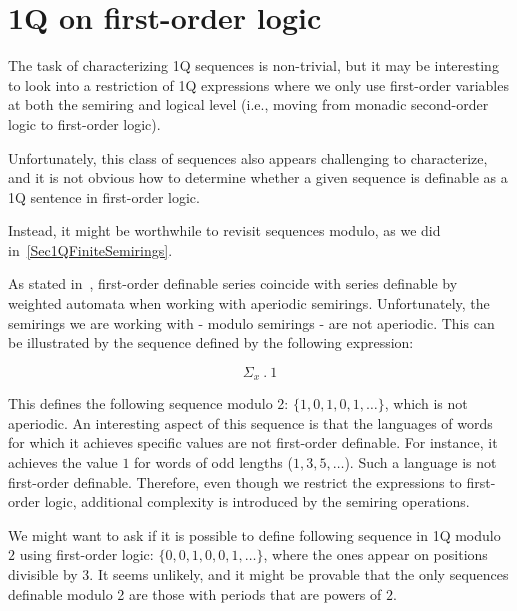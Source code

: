 \documentclass[en]{pracamgr}
\theoremstyle{definition}
\begin{document}
\section{1Q on first-order logic}
The task of characterizing 1Q sequences is non-trivial, but it may be interesting to look into a restriction of 1Q expressions where we only use first-order variables at both the semiring and logical level (i.e., moving from monadic second-order logic to first-order logic).

Unfortunately, this class of sequences also appears challenging to characterize, and it is not obvious how to determine whether a given sequence is definable as a 1Q sentence in first-order logic.

Instead, it might be worthwhile to revisit sequences modulo, as we did in~\cref{Sec1QFiniteSemirings}.

As stated in~\cite{DrosteG07}, first-order definable series coincide with series definable by weighted automata when working with aperiodic semirings. Unfortunately, the semirings we are working with - modulo semirings - are not aperiodic. This can be illustrated by the sequence defined by the following expression:

$$ \Sigma_x \ . \ 1 $$

This defines the following sequence modulo 2: $\{1, 0, 1, 0, 1, \ldots\}$, which is not aperiodic. An interesting aspect of this sequence is that the languages of words for which it achieves specific values are not first-order definable. For instance, it achieves the value $1$ for words of odd lengths ($1, 3, 5, \ldots$). Such a language is not first-order definable. Therefore, even though we restrict the expressions to first-order logic, additional complexity is introduced by the semiring operations.

We might want to ask if it is possible to define following sequence in 1Q modulo $2$ using first-order logic: $\{0, 0, 1, 0, 0, 1, \ldots\}$, where the ones appear on positions divisible by 3. It seems unlikely, and it might be provable that the only sequences definable modulo 2 are those with periods that are powers of $2$.



\end{document}
